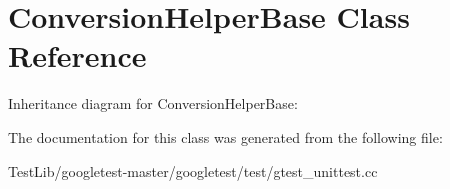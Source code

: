 \hypertarget{classConversionHelperBase}{}\section{Conversion\+Helper\+Base Class Reference}
\label{classConversionHelperBase}


Inheritance diagram for Conversion\+Helper\+Base\+:


The documentation for this class was generated from the following file\+:\begin{DoxyCompactItemize}
\item 
Test\+Lib/googletest-\/master/googletest/test/gtest\+\_\+unittest.\+cc\end{DoxyCompactItemize}
